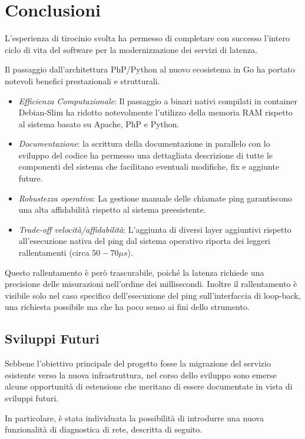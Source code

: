 \chapter{Conclusioni}
\label{chap:conclusion}
L'esperienza di tirocinio svolta ha permesso di completare con successo l'intero ciclo di vita del software per la modernizzazione dei servizi di latenza.

Il passaggio dall'architettura PhP/Python al nuovo ecosistema in Go ha portato notevoli benefici prestazionali e strutturali.
\begin{itemize}
    \item \emph{Efficienza Computazionale}: Il passaggio a binari nativi compilati in container Debian-Slim ha ridotto notevolmente l'utilizzo della memoria RAM rispetto al sistema basato su Apache, PhP e Python.
    \item \emph{Documentazione}: la scrittura della documentazione in parallelo con lo sviluppo del codice ha permesso una dettagliata descrizione di tutte le componenti del sistema che facilitano eventuali modifiche, fix e aggiunte future.
    \item \emph{Robustezza operativa}: La gestione manuale delle chiamate ping garantiscono una alta affidabilità rispetto al sistema preesistente.
    \item \emph{Trade-off velocità/affidabilità}: L'aggiunta di diversi layer aggiuntivi rispetto all'esecuzione nativa del ping dal sistema operativo riporta dei leggeri rallentamenti (circa $50-70 \mu s$).
\end{itemize}

Questo rallentamento è però trascurabile, poiché la latenza richiede una precisione delle misurazioni nell'ordine dei millisecondi. Inoltre il rallentamento è visibile solo nel caso specifico dell'esecuzione del ping sull'interfaccia di loop-back, una richiesta possibile ma che ha poco senso ai fini dello strumento.

\section{Sviluppi Futuri}
Sebbene l'obiettivo principale del progetto fosse la migrazione del servizio esistente verso la nuova infrastruttura, nel corso dello sviluppo sono emerse alcune opportunità di estensione che meritano di essere documentate in vista di sviluppi futuri.

In particolare, è stata individuata la possibilità di introdurre una nuova funzionalità di diagnostica di rete, descritta di seguito.
